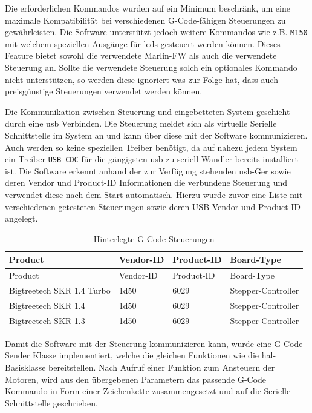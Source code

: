 Die erforderlichen Kommandos wurden auf ein Minimum beschränk, um eine
maximale Kompatibilität bei verschiedenen G-Code-fähigen Steuerungen zu
gewährleisten. Die Software unterstützt jedoch weitere Kommandos wie
z.B. \passthrough{\lstinline!M150!} mit welchem speziellen Ausgänge für
\gls{led}s gesteuert werden können. Dieses Feature bietet sowohl die
verwendete Marlin-FW\cite{marlinfw} als auch die verwendete
Steuerung an. Sollte die verwendete Steuerung solch ein optionales
Kommando nicht unterstützen, so werden diese ignoriert was zur Folge
hat, dass auch preisgünstige Steuerungen verwendet werden können.

Die Kommunikation zwischen Steuerung und eingebetteten System geschieht
durch eine \gls{usb} Verbinden. Die Steuerung meldet sich als virtuelle
Serielle Schnittstelle im System an und kann über diese mit der Software
kommunizieren. Auch werden so keine speziellen Treiber benötigt, da auf
nahezu jedem System ein Treiber \passthrough{\lstinline!USB-CDC!} für
die gängigsten \gls{usb} zu seriell Wandler bereits installiert ist. Die
Software erkennt anhand der zur Verfügung stehenden \gls{usb}-Ger sowie
deren Vendor und Product-ID Informationen die verbundene Steuerung und
verwendet diese nach dem Start automatisch. Hierzu wurde zuvor eine
Liste mit verschiedenen getesteten Steuerungen sowie deren USB-Vendor
und Product-ID angelegt.

\begin{longtable}[]{@{}llll@{}}
\caption{Hinterlegte G-Code Steuerungen}\tabularnewline
\toprule
Product & Vendor-ID & Product-ID & Board-Type\tabularnewline
\midrule
\endfirsthead
\toprule
Product & Vendor-ID & Product-ID & Board-Type\tabularnewline
\midrule
\endhead
Bigtreetech SKR 1.4 Turbo & 1d50 & 6029 &
Stepper-Controller\tabularnewline
Bigtreetech SKR 1.4 & 1d50 & 6029 & Stepper-Controller\tabularnewline
Bigtreetech SKR 1.3 & 1d50 & 6029 & Stepper-Controller\tabularnewline
\bottomrule
\end{longtable}

Damit die Software mit der Steuerung kommunizieren kann, wurde eine
G-Code Sender Klasse implementiert, welche die gleichen Funktionen wie
die \gls{hal}-Basisklasse bereitstellen. Nach Aufruf einer Funktion zum
Ansteuern der Motoren, wird aus den übergebenen Parametern das passende
G-Code Kommando in Form einer Zeichenkette zusammengesetzt und auf die
Serielle Schnittstelle geschrieben.

